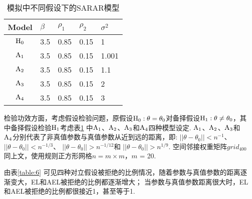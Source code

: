 \documentclass[a4paper,c5size,onecolumn,twoside,cap,Chinese]{APSart}
\begin{document}
\begin{table}[htbp]
\setlength{\abovecaptionskip}{0.cm}%
\renewcommand\arraystretch{0.8}%
\caption{ 模拟中不同假设下的SARAR模型\label{table:5}} 
\begin{tabular*}{\hsize}{@{}@{\extracolsep{\fill}}cllll@{}}
\hline
Model  & $\beta$  & $\rho_1$  & $\rho_2$ & $\sigma^2$\\
\hline
$\rm{H_0}$  &3.5   &0.85 &0.15 &1   \\
$\rm{A_1}$ &3.5   &0.85 &0.15 &1.001  \\
$\rm{A_2}$ &3.5   &0.85 &0.15 &1.1  \\
$\rm{A_3}$  &3.5   &0.85 &0.15 &2   \\
$\rm{A_4}$  &3.5   &0.85 &0.15 &3   \\
\hline
\end{tabular*}
\end{table}

检验功效方面，考虑假设检验问题，原假设$\rm{H_0}:\theta = \theta_0$对备择假设$\rm{H_1}:\theta \neq \theta_0$，其中备择假设检验$\rm{H_1}$考虑表\ref{table:5} 中$\rm{A_1}$、$\rm{A_2}$、$\rm{A_3}$和$\rm{A_4}$四种模型设定. $\rm{A_1}$、$\rm{A_2}$、$\rm{A_3}$和$\rm{A_4}$分别代表了非真值参数与真值参数从近到远的距离，即: $||\theta-\theta_0||<n^{-1}$、
$ ||\theta-\theta_0||<n^{-1/3}$、
$||\theta-\theta_0||>n^{-1/12} $和
$||\theta-\theta_0|| >n^{1/9}$. 
空间邻接权重矩阵$grid_{400}$同上文，使用规则正方形网格$n=m×m$，$m$ = 20.

由表\ref{table:6} 可见四种对立假设被拒绝的比例情况，随着参数与真值参数的距离逐渐变大，EL和AEL被拒绝的比例都逐渐增大；  当参数与真值参数距离很大时，EL和AEL被拒绝的比例都很接近1，甚至等于1.
\end{document}

